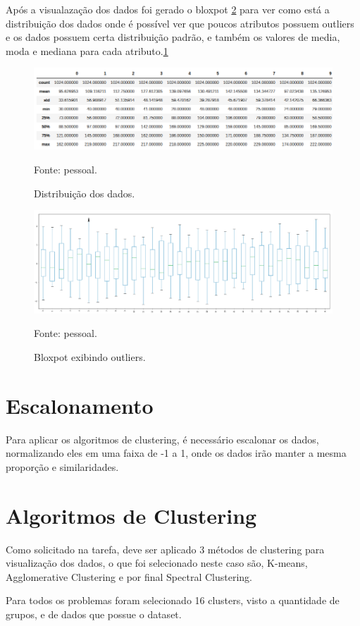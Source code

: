 Após a visualazação dos dados foi gerado o bloxpot \ref{fig:bloxpot} para ver como está a distribuição dos dados onde é possível ver que poucos atributos possuem outliers e os dados possuem certa distribuição padrão, e também os valores de media, moda e mediana para cada atributo.\ref{fig:describe}

\begin{figure}[h]
	\centering
	\includegraphics[width=0.7\linewidth]{images/describe}
	\caption{Distribuição dos dados.}
	Fonte: pessoal.
	\label{fig:describe}
\end{figure}

\begin{figure}[h]
	\centering
	\includegraphics[width=0.7\linewidth]{images/bloxpot}
	\caption{Bloxpot exibindo outliers.}
	Fonte: pessoal.
	\label{fig:bloxpot}
\end{figure}


\section{Escalonamento}
Para aplicar os algoritmos de clustering, é necessário escalonar os dados, normalizando eles em uma faixa de -1 a 1, onde os dados irão manter a mesma proporção e similaridades.

\section{Algoritmos de Clustering}

Como solicitado na tarefa, deve ser aplicado 3 métodos de clustering  para visualização dos dados, o que foi selecionado neste caso são, K-means, Agglomerative Clustering
e por final Spectral Clustering.

Para todos os problemas foram selecionado 16 clusters, visto a quantidade de grupos, e de dados que possue o dataset.

